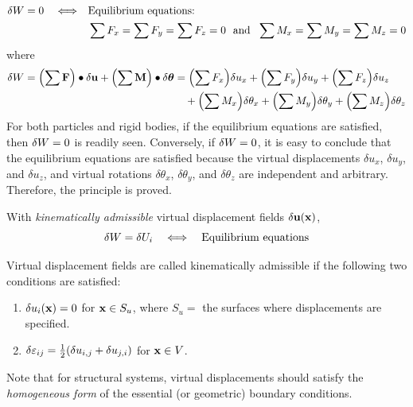 \begin{equation}
  \begin{aligned}
    \delta W = 0 \quad\Longleftrightarrow\quad &\text{Equilibrium equations: }\\
    &\sum F_x = \sum F_y = \sum F_z = 0\ \text{ and }\ \sum M_x = \sum M_y = \sum M_z = 0
  \end{aligned}
\end{equation}
where
\begin{equation}
  \begin{aligned}
    \delta W = \Bigl(\sum\mathbf{F}\Bigr)\bullet\delta\mathbf{u} + \Bigl(\sum\mathbf{M}\Bigr)\bullet\delta\bm{\theta}
    &= \Bigl(\sum F_x\Bigr)\delta u_x + \Bigl(\sum F_y\Bigr)\delta u_y + \Bigl(\sum F_z\Bigr)\delta u_z\\
    &\quad + \Bigl(\sum M_x\Bigr)\delta\theta_x + \Bigl(\sum M_y\Bigr)\delta\theta_y + \Bigl(\sum M_z\Bigr)\delta\theta_z
  \end{aligned}
\end{equation}
For both particles and rigid bodies, if the equilibrium equations are satisfied, then $\delta W = 0$ is readily seen. Conversely, if $\delta W = 0$, it is easy to conclude that the equilibrium equations are satisfied because the virtual displacements $\delta u_x$, $\delta u_y$, and $\delta u_z$, and virtual rotations $\delta\theta_x$, $\delta\theta_y$, and $\delta\theta_z$ are independent and arbitrary. Therefore, the principle is proved.

\begin{keypoint}
With \emph{kinematically admissible} virtual displacement fields $\delta\mathbf{u}(\mathbf{x})$,
\begin{equation*}
  \delta W = \delta U_i \quad\Longleftrightarrow\quad \text{Equilibrium equations}
\end{equation*}
\end{keypoint}
Virtual displacement fields are called kinematically admissible if the following two conditions are satisfied:
\begin{enumerate}[label=(\arabic*)]
  \item $\delta u_i(\mathbf{x}) = 0$ for $\mathbf{x}\in S_u$, where $S_u =$ the surfaces where displacements are specified.
  \item $\delta\varepsilon_{ij} = \frac12(\delta u_{i,j}+\delta u_{j,i})$ for $\mathbf{x}\in V$.
\end{enumerate}
Note that for structural systems, virtual displacements should satisfy the \emph{homogeneous form} of the essential (or geometric) boundary conditions.

